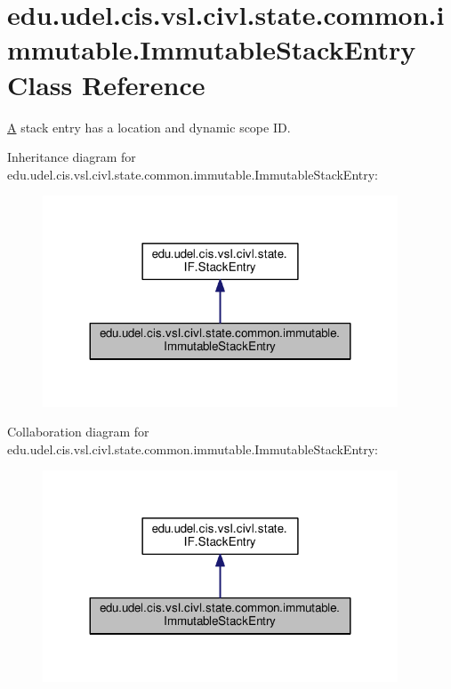 \hypertarget{classedu_1_1udel_1_1cis_1_1vsl_1_1civl_1_1state_1_1common_1_1immutable_1_1ImmutableStackEntry}{}\section{edu.\+udel.\+cis.\+vsl.\+civl.\+state.\+common.\+immutable.\+Immutable\+Stack\+Entry Class Reference}
\label{classedu_1_1udel_1_1cis_1_1vsl_1_1civl_1_1state_1_1common_1_1immutable_1_1ImmutableStackEntry}


\hyperlink{structA}{A} stack entry has a location and dynamic scope I\+D.  




Inheritance diagram for edu.\+udel.\+cis.\+vsl.\+civl.\+state.\+common.\+immutable.\+Immutable\+Stack\+Entry\+:
\nopagebreak
\begin{figure}[H]
\begin{center}
\leavevmode
\includegraphics[width=299pt]{classedu_1_1udel_1_1cis_1_1vsl_1_1civl_1_1state_1_1common_1_1immutable_1_1ImmutableStackEntry__inherit__graph}
\end{center}
\end{figure}


Collaboration diagram for edu.\+udel.\+cis.\+vsl.\+civl.\+state.\+common.\+immutable.\+Immutable\+Stack\+Entry\+:
\nopagebreak
\begin{figure}[H]
\begin{center}
\leavevmode
\includegraphics[width=299pt]{classedu_1_1udel_1_1cis_1_1vsl_1_1civl_1_1state_1_1common_1_1immutable_1_1ImmutableStackEntry__coll__graph}
\end{center}
\end{figure}
